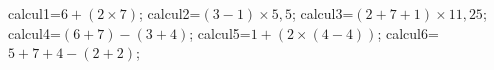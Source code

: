 \documentclass[exercice]{thedocument}%
\begin{document}
%
    \>calcul1=$6+(2\times 7)$;%
    \>calcul2=$(3-1)\times5,5$;%
    \>calcul3=$(2+7+1)\times11,25$;%
    \>calcul4=$(6+7)-(3+4)$;%
    \>calcul5=$1+(2\times (4-4))$;%
    \>calcul6=$5+7+4-(2+2)$;%
\end{document}
